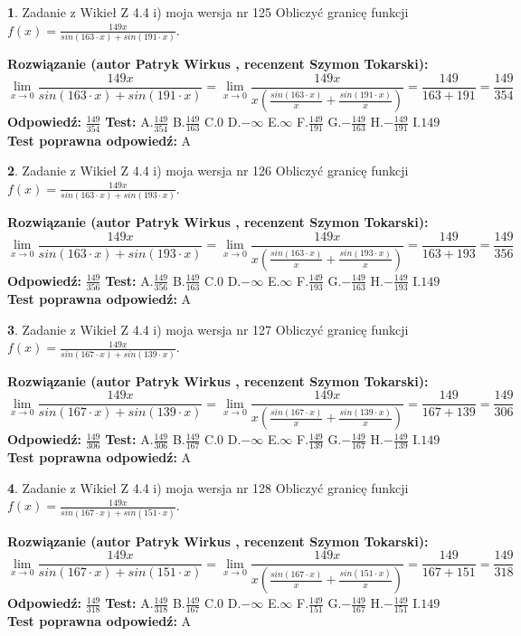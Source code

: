 \documentclass[12pt, a4paper]{article}
\theoremstyle{definition} %
\newtheorem{zad}{}
\newcommand{\zadStart}[1]{\begin{zad}#1\newline}
\newcommand{\zadStop}{\end{zad}}
\newcommand{\rozwStart}[2]{\noindent \textbf{Rozwiązanie (autor #1 , recenzent #2): }\newline}
\newcommand{\rozwStop}{\newline}
\newcommand{\odpStart}{\noindent \textbf{Odpowiedź:}\newline}
\newcommand{\odpStop}{\newline}
\newcommand{\testStart}{\noindent \textbf{Test:}\newline}
\newcommand{\testStop}{\newline}
\newcommand{\kluczStart}{\noindent \textbf{Test poprawna odpowiedź:}\newline}
\newcommand{\kluczStop}{\newline}
\begin{document}
\zadStart{Zadanie z Wikieł Z 4.4 i) moja wersja nr 125}
Obliczyć granicę funkcji $f(x)=\frac{149x}{sin(163\cdot x) +sin(191\cdot x)}$.
\zadStop
\rozwStart{Patryk Wirkus}{Szymon Tokarski}
$$\lim\limits_{x\to 0}\frac{149x}{sin(163\cdot x) +sin(191\cdot x)}=\lim\limits_{x\to 0}\frac{149x}{x(\frac{sin(163\cdot x)}{x}+\frac{sin(191\cdot x)}{x})}=\frac{149}{163+191} = \frac{149}{354}$$
\rozwStop
\odpStart
$\frac{149}{354}$
\odpStop
\testStart
A.$\frac{149}{354}$
B.$\frac{149}{163}$
C.$0$
D.$-\infty$
E.$\infty$
F.$\frac{149}{191}$
G.$-\frac{149}{163}$
H.$-\frac{149}{191}$
I.$149$
\testStop
\kluczStart
A
\kluczStop



\zadStart{Zadanie z Wikieł Z 4.4 i) moja wersja nr 126}
Obliczyć granicę funkcji $f(x)=\frac{149x}{sin(163\cdot x) +sin(193\cdot x)}$.
\zadStop
\rozwStart{Patryk Wirkus}{Szymon Tokarski}
$$\lim\limits_{x\to 0}\frac{149x}{sin(163\cdot x) +sin(193\cdot x)}=\lim\limits_{x\to 0}\frac{149x}{x(\frac{sin(163\cdot x)}{x}+\frac{sin(193\cdot x)}{x})}=\frac{149}{163+193} = \frac{149}{356}$$
\rozwStop
\odpStart
$\frac{149}{356}$
\odpStop
\testStart
A.$\frac{149}{356}$
B.$\frac{149}{163}$
C.$0$
D.$-\infty$
E.$\infty$
F.$\frac{149}{193}$
G.$-\frac{149}{163}$
H.$-\frac{149}{193}$
I.$149$
\testStop
\kluczStart
A
\kluczStop



\zadStart{Zadanie z Wikieł Z 4.4 i) moja wersja nr 127}
Obliczyć granicę funkcji $f(x)=\frac{149x}{sin(167\cdot x) +sin(139\cdot x)}$.
\zadStop
\rozwStart{Patryk Wirkus}{Szymon Tokarski}
$$\lim\limits_{x\to 0}\frac{149x}{sin(167\cdot x) +sin(139\cdot x)}=\lim\limits_{x\to 0}\frac{149x}{x(\frac{sin(167\cdot x)}{x}+\frac{sin(139\cdot x)}{x})}=\frac{149}{167+139} = \frac{149}{306}$$
\rozwStop
\odpStart
$\frac{149}{306}$
\odpStop
\testStart
A.$\frac{149}{306}$
B.$\frac{149}{167}$
C.$0$
D.$-\infty$
E.$\infty$
F.$\frac{149}{139}$
G.$-\frac{149}{167}$
H.$-\frac{149}{139}$
I.$149$
\testStop
\kluczStart
A
\kluczStop



\zadStart{Zadanie z Wikieł Z 4.4 i) moja wersja nr 128}
Obliczyć granicę funkcji $f(x)=\frac{149x}{sin(167\cdot x) +sin(151\cdot x)}$.
\zadStop
\rozwStart{Patryk Wirkus}{Szymon Tokarski}
$$\lim\limits_{x\to 0}\frac{149x}{sin(167\cdot x) +sin(151\cdot x)}=\lim\limits_{x\to 0}\frac{149x}{x(\frac{sin(167\cdot x)}{x}+\frac{sin(151\cdot x)}{x})}=\frac{149}{167+151} = \frac{149}{318}$$
\rozwStop
\odpStart
$\frac{149}{318}$
\odpStop
\testStart
A.$\frac{149}{318}$
B.$\frac{149}{167}$
C.$0$
D.$-\infty$
E.$\infty$
F.$\frac{149}{151}$
G.$-\frac{149}{167}$
H.$-\frac{149}{151}$
I.$149$
\testStop
\kluczStart
A
\kluczStop
\end{document}
